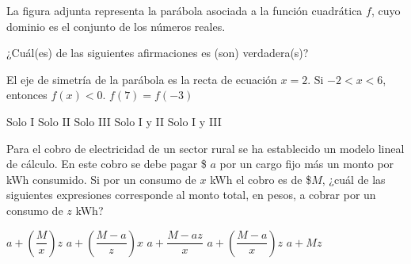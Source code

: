 \documentclass[
  titulo=Prueba,
  subtitulo=Álgebra y funciones,
  curso=Tercero medio B,
  fecha=2025-09-26,
  con nombre,
  ppp=1
]{srs3}
\begin{document}
\begin{preguntas}
\pregunta La figura adjunta representa la parábola asociada a la función cuadrática \(f\), cuyo dominio es el conjunto de los números reales.
\begin{columnas}
¿Cuál(es) de las siguientes afirmaciones es (son) verdadera(s)?
\begin{opciones}
\opcion El eje de simetría de la parábola es la recta de ecuación \( x=2 \).
\opcion Si \(-2 < x < 6\), entonces \(f\left(x\right)<0\).
\opcion \( f\left(7\right) = f\left(-3\right) \)
\end{opciones}
\begin{alternativas}
\alternativa Solo I
\alternativa Solo II
\alternativa Solo III
\alternativa Solo I y II
\alternativa Solo I y III
\end{alternativas}
\siguiente
{}
\end{columnas}

\pregunta Para el cobro de electricidad de un sector rural se ha establecido un modelo lineal de cálculo. En este cobro se debe pagar \$ \(a\) por un cargo fijo más un monto por kWh consumido. Si por un consumo de \(x\) kWh el cobro es de \$\(M\), ¿cuál de las siguientes expresiones corresponde al monto total, en pesos, a cobrar por un consumo de \(z\) kWh?
\begin{alternativas}
\alternativa \(a + \left(\dfrac{M}{x}\right)z\)
\alternativa \(a + \left(\dfrac{M-a}{z}\right)x\)
\alternativa \(a + \dfrac{M-az}{x}\)
\alternativa \(a + \left(\dfrac{M-a}{x}\right)z\)
\alternativa \(a + Mz\)
\end{alternativas}


\end{preguntas}
\end{document}
